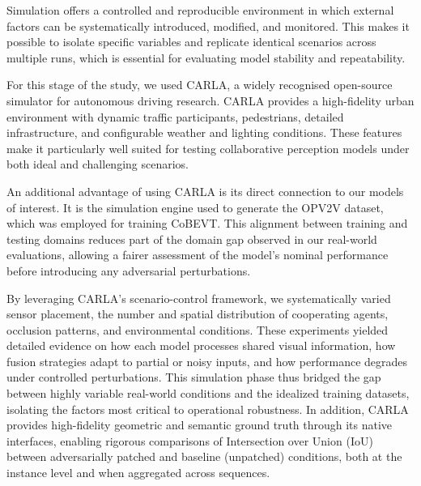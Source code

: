 Simulation offers a controlled and reproducible environment in which external factors can be systematically introduced, modified, and monitored.
This makes it possible to isolate specific variables and replicate identical scenarios across multiple runs, which is essential for evaluating model stability and repeatability.

For this stage of the study, we used CARLA\cite{Dosovitskiy17}, a widely recognised open-source simulator for autonomous driving research.
CARLA provides a high-fidelity urban environment with dynamic traffic participants, pedestrians, detailed infrastructure, and configurable weather and lighting conditions.
These features make it particularly well suited for testing collaborative perception models under both ideal and challenging scenarios.

An additional advantage of using CARLA is its direct connection to our models of interest.
It is the simulation engine used to generate the OPV2V dataset\cite{xu2022opv2vopenbenchmarkdataset}, which was employed for training CoBEVT.
This alignment between training and testing domains reduces part of the domain gap observed in our real-world evaluations, allowing a fairer assessment of the model’s nominal performance before introducing any adversarial perturbations.

By leveraging CARLA’s scenario-control framework, we systematically varied sensor placement, the number and spatial distribution of cooperating agents, occlusion patterns, and environmental conditions. 
These experiments yielded detailed evidence on how each model processes shared visual information, how fusion strategies adapt to partial or noisy inputs, and how performance degrades under controlled perturbations. 
This simulation phase thus bridged the gap between highly variable real-world conditions and the idealized training datasets, isolating the factors most critical to operational robustness. 
In addition, CARLA provides high-fidelity geometric and semantic ground truth through its native interfaces, enabling rigorous comparisons of Intersection over Union (IoU) between adversarially patched and baseline (unpatched) conditions, both at the instance level and when aggregated across sequences.